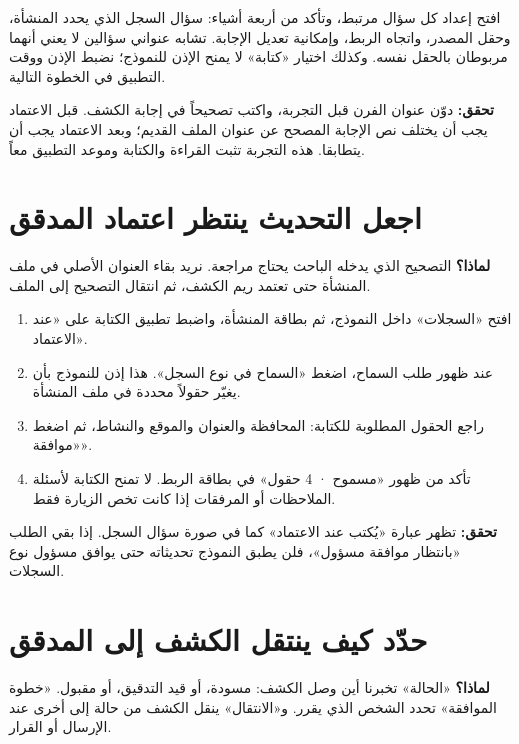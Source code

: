 افتح إعداد كل سؤال مرتبط، وتأكد من أربعة أشياء: سؤال السجل الذي يحدد المنشأة، وحقل المصدر، واتجاه الربط، وإمكانية تعديل الإجابة. تشابه عنواني سؤالين لا يعني أنهما مربوطان بالحقل نفسه. وكذلك اختيار «كتابة» لا يمنح الإذن للنموذج؛ نضبط الإذن ووقت التطبيق في الخطوة التالية.

\textbf{تحقق:} دوّن عنوان الفرن قبل التجربة، واكتب تصحيحاً في إجابة الكشف. قبل الاعتماد يجب أن يختلف نص الإجابة المصحح عن عنوان الملف القديم؛ وبعد الاعتماد يجب أن يتطابقا. هذه التجربة تثبت القراءة والكتابة وموعد التطبيق معاً.

\section{اجعل التحديث ينتظر اعتماد المدقق}
\label{sec:build-allow}

\textbf{لماذا؟} التصحيح الذي يدخله الباحث يحتاج مراجعة. نريد بقاء العنوان الأصلي في ملف المنشأة حتى تعتمد ريم الكشف، ثم انتقال التصحيح إلى الملف.

\begin{enumerate}
\item افتح «السجلات» داخل النموذج، ثم بطاقة المنشأة، واضبط تطبيق الكتابة على «عند الاعتماد».
\item عند ظهور طلب السماح، اضغط «السماح في نوع السجل». هذا إذن للنموذج بأن يغيّر حقولاً محددة في ملف المنشأة.
\item راجع الحقول المطلوبة للكتابة: المحافظة والعنوان والموقع والنشاط، ثم اضغط «موافقة».
\item تأكد من ظهور «مسموح · 4 حقول» في بطاقة الربط. لا تمنح الكتابة لأسئلة الملاحظات أو المرفقات إذا كانت تخص الزيارة فقط.
\end{enumerate}

\textbf{تحقق:} تظهر عبارة «يُكتب عند الاعتماد» كما في صورة سؤال السجل. إذا بقي الطلب «بانتظار موافقة مسؤول»، فلن يطبق النموذج تحديثاته حتى يوافق مسؤول نوع السجلات.

\section{حدّد كيف ينتقل الكشف إلى المدقق}
\label{sec:build-journey}

\textbf{لماذا؟} «الحالة» تخبرنا أين وصل الكشف: مسودة، أو قيد التدقيق، أو مقبول. «خطوة الموافقة» تحدد الشخص الذي يقرر. و«الانتقال» ينقل الكشف من حالة إلى أخرى عند الإرسال أو القرار.

